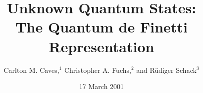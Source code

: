 

\tightenlines

\newcommand{\bq}{\begin{quotation}\noindent}
\newcommand{\eq}{\end{quotation}\medskip}

\def\mat#1#2#3#4{\left(\matrix{{#1}&{#2}\cr {#3}&{#4}}\right)}
\def\tr{{\rm tr}}

\def\vec#1{{\bf #1}}



\draft

\title{Unknown Quantum States: \\
The Quantum de Finetti Representation}

\author{Carlton M. Caves,$^1$ Christopher A. Fuchs,$^2$ and
R\"udiger Schack$^3$\medskip}

\address{$^1$Department of Physics and Astronomy, University of New Mexico,
\\
Albuquerque, New Mexico 87131--1156, USA
\\
$^2$Computing Science Research Center, Bell Labs, Lucent Technologies,
\\
Room 2C-420, 600--700 Mountain Avenue, Murray Hill, New Jersey 07974,
USA
\\
$^3$Department of Mathematics, Royal Holloway, University of London,
\\
Egham, Surrey TW20$\;$0EX, UK}

\date{17 March 2001}

\maketitle

